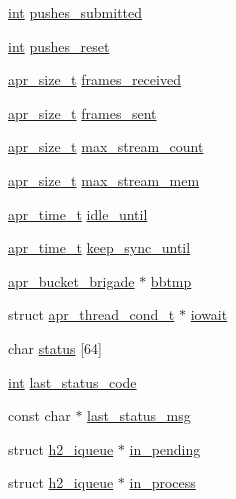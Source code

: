 \begin{DoxyCompactItemize}
\hyperlink{pcre_8txt_a42dfa4ff673c82d8efe7144098fbc198}{int} \hyperlink{structh2__session_ab487f1f9ed10e453a8c2eb2b3d29262e}{pushes\+\_\+submitted}
\item 
\hyperlink{pcre_8txt_a42dfa4ff673c82d8efe7144098fbc198}{int} \hyperlink{structh2__session_ad7b4450c6d7a2d4df9ed05ac59a6abbb}{pushes\+\_\+reset}
\item 
\hyperlink{group__apr__platform_gaaa72b2253f6f3032cefea5712a27540e}{apr\+\_\+size\+\_\+t} \hyperlink{structh2__session_a47b83dcfb8bd01365dad40c83fb6f477}{frames\+\_\+received}
\item 
\hyperlink{group__apr__platform_gaaa72b2253f6f3032cefea5712a27540e}{apr\+\_\+size\+\_\+t} \hyperlink{structh2__session_a5f0c658ec26cb2dd4187e1094d50182b}{frames\+\_\+sent}
\item 
\hyperlink{group__apr__platform_gaaa72b2253f6f3032cefea5712a27540e}{apr\+\_\+size\+\_\+t} \hyperlink{structh2__session_a766c806055e07b4ea3cdff5cc798d149}{max\+\_\+stream\+\_\+count}
\item 
\hyperlink{group__apr__platform_gaaa72b2253f6f3032cefea5712a27540e}{apr\+\_\+size\+\_\+t} \hyperlink{structh2__session_abecafc57e4ac2320b1310e5e8506d152}{max\+\_\+stream\+\_\+mem}
\item 
\hyperlink{group__apr__time_gadb4bde16055748190eae190c55aa02bb}{apr\+\_\+time\+\_\+t} \hyperlink{structh2__session_afd1f0cce4dfac9f26e4eee799db2051e}{idle\+\_\+until}
\item 
\hyperlink{group__apr__time_gadb4bde16055748190eae190c55aa02bb}{apr\+\_\+time\+\_\+t} \hyperlink{structh2__session_a821fc14674cab8fc3ed1388876fd9522}{keep\+\_\+sync\+\_\+until}
\item 
\hyperlink{structapr__bucket__brigade}{apr\+\_\+bucket\+\_\+brigade} $\ast$ \hyperlink{structh2__session_a12214fa117a9a29bec0cd4922b118363}{bbtmp}
\item 
struct \hyperlink{structapr__thread__cond__t}{apr\+\_\+thread\+\_\+cond\+\_\+t} $\ast$ \hyperlink{structh2__session_ab9866598c740b22aa6019a36e531b421}{iowait}
\item 
char \hyperlink{structh2__session_ab11699f2c77d30c38703009499a31708}{status} \mbox{[}64\mbox{]}
\item 
\hyperlink{pcre_8txt_a42dfa4ff673c82d8efe7144098fbc198}{int} \hyperlink{structh2__session_a8a628e0dc89d30bfa9fae1c9849ca18c}{last\+\_\+status\+\_\+code}
\item 
const char $\ast$ \hyperlink{structh2__session_ab19037ec42735b9f7c84950f3edbfc92}{last\+\_\+status\+\_\+msg}
\item 
struct \hyperlink{structh2__iqueue}{h2\+\_\+iqueue} $\ast$ \hyperlink{structh2__session_a9f38c1f8b552e121ec4ae45d0c2f5009}{in\+\_\+pending}
\item 
struct \hyperlink{structh2__iqueue}{h2\+\_\+iqueue} $\ast$ \hyperlink{structh2__session_a01b5930c2e5f2dc7377e7672942f0b22}{in\+\_\+process}
\end{DoxyCompactItemize}


